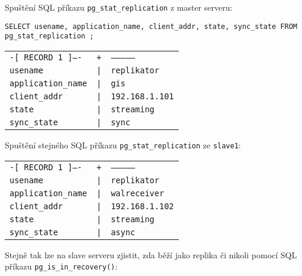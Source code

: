 Spuštění SQL příkazu \texttt{pg\_stat\_replication} z master serveru:

\begin{lstlisting}
SELECT usename, application_name, client_addr, state, sync_state FROM pg_stat_replication ;
\end{lstlisting}

    \begin{table}[H]
      \label{pgHba}
        \begin{center}
          \begin{tabular}{lll}
            \texttt{-[ RECORD 1 ]----} & \texttt{+} & \texttt{--------------}\\
                      \texttt{usename} &           \texttt{|} &  \texttt{replikator}\\
            \texttt{application\_name} &  \texttt{|} &  \texttt{gis}\\
                 \texttt{client\_addr} &       \texttt{|} &  \texttt{192.168.1.101}\\
                        \texttt{state} &             \texttt{|} &  \texttt{streaming}\\
                  \texttt{sync\_state} &        \texttt{|} &  \texttt{sync}\\
          \end{tabular}
        \end{center}
    \end{table}

Spuštění stejného SQL příkazu \texttt{pg\_stat\_replication} ze \texttt{slave1}:

    \begin{table}[H]
      \label{pgHba}
        \begin{center}
          \begin{tabular}{lll}
            \texttt{-[ RECORD 1 ]----} & \texttt{+} & \texttt{--------------}\\
                      \texttt{usename} &           \texttt{|} &  \texttt{replikator}\\
            \texttt{application\_name} &  \texttt{|} &  \texttt{walreceiver}\\
                 \texttt{client\_addr} &       \texttt{|} &  \texttt{192.168.1.102}\\
                        \texttt{state} &             \texttt{|} &  \texttt{streaming}\\
                  \texttt{sync\_state} &        \texttt{|} &  \texttt{async}\\
          \end{tabular}
        \end{center}
    \end{table}
Stejně tak lze na slave serveru zjistit, zda běží jako replika či nikoli pomocí SQL příkazu \texttt{pg\_is\_in\_recovery()}:

